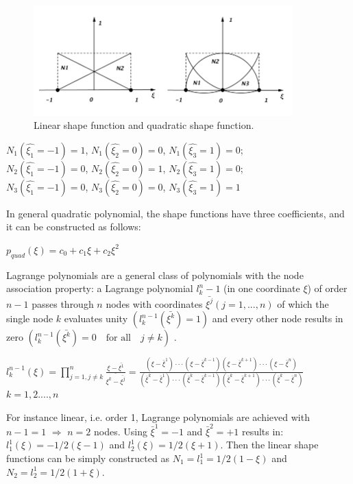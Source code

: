 \begin{figure}
	\begin{center}
		\includegraphics[width=10cm,clip]{shape_func.pdf} 		
		\caption{Linear shape function and quadratic shape function.} \label{fig: shape_func}	
	\end{center}
\end{figure}

\begin{center}
	$N_1\left(\hat{\xi_1} = -1\right) = 1$, $N_1\left(\hat{\xi_2} = 0\right) = 0$, $N_1\left(\hat{\xi_3} = 1\right) = 0$;\\
	$N_2\left(\hat{\xi_1} = -1\right) = 0$, $N_2\left(\hat{\xi_2} = 0\right) = 1$, $N_2\left(\hat{\xi_3} = 1\right) = 0$;\\
	$N_3\left(\hat{\xi_1} = -1\right) = 0$, $N_3\left(\hat{\xi_2} = 0\right) = 0$, $N_3\left(\hat{\xi_3} = 1\right) = 1$
\end{center}

In general quadratic polynomial, the shape functions have three coefficients, and it can be constructed as follows:
\begin{center}
	$p_{quad}\left(\xi\right) = c_0 + c_1\xi + c_2\xi^2$
\end{center}

Lagrange polynomials are a general class of polynomials with the node association property: a Lagrange polynomial $l_k^n-1$ (in one coordinate $\xi$) of order $n-1$ passes through $n$ nodes with coordinates $\bar{\xi^j}\left(j = 1,...,n\right)$ of which the single node $k$ evaluates unity $\left(l_k^{n-1} \left(\bar{\xi^k}\right)=1\right)$ and every other node results in zero $\left(l_k^{n-1} \left(\bar{\xi^k}\right)=0  \quad \text{for all} \quad j \neq k\right)$ .

\begin{center}
	$l_k^{n-1} \left( \xi \right) = \prod_{j = 1, j \neq k}^{n} \frac{\xi - \bar{\xi^1}}{\bar{\xi^k - \bar{\xi^j}}} = \frac{\left(\xi - \bar{\xi}^1\right)\cdot\cdot\cdot \left( \xi - \bar{\xi}^{k-1}\right) \left(\xi - \bar{\xi}^{k+1}\right)\cdot\cdot\cdot \left(\xi -\bar{\xi}^n\right)}{\left(\bar{\xi}^k - \bar{\xi}^1\right)\cdot\cdot\cdot \left( \bar{\xi}^k - \bar{\xi}^{k-1}\right) \left(\bar{\xi}^k - \bar{\xi}^{k+1}\right)\cdot\cdot\cdot \left(\bar{\xi}^k -\bar{\xi}^n\right)}$ \\[4mm] \quad $k = 1,2....,n$
\end{center}
For instance linear, i.e. order 1, Lagrange polynomials are achieved with $n-1=1$ $\Rightarrow$ $n=2$ nodes. Using $\bar{\xi}^1 = -1$ and $\bar{\xi}^2 = +1$ results in: $l_1^1\left(\xi\right) = -1/2\left(\xi - 1\right)$ and $l_2^1\left(\xi\right) = 1/2\left(\xi + 1\right)$.
Then the linear shape functions can be simply constructed as $N_1 =l_1^1 = 1/2\left(1-\xi\right)$ and $N_2 = l_2^1 = 1/2\left(1+\xi\right)$.

